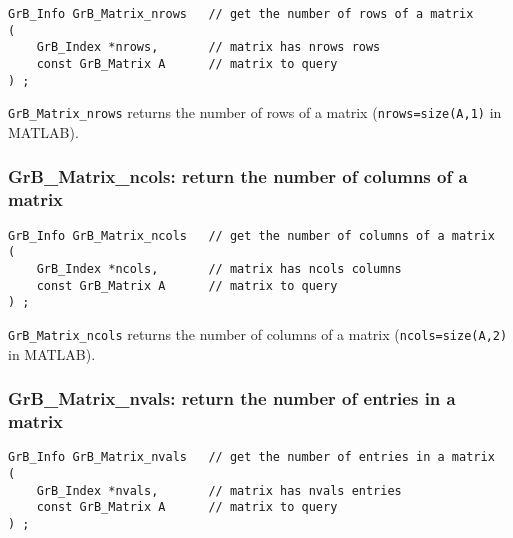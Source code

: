 \documentclass[12pt]{article}
\begin{document}
{\begin{mdframed}[userdefinedwidth=6in]
{\footnotesize
\begin{verbatim}
GrB_Info GrB_Matrix_nrows   // get the number of rows of a matrix
(
    GrB_Index *nrows,       // matrix has nrows rows
    const GrB_Matrix A      // matrix to query
) ;
\end{verbatim} } \end{mdframed}

\verb'GrB_Matrix_nrows' returns the number of rows of a matrix
(\verb'nrows=size(A,1)' in MATLAB).

\subsubsection{{\sf GrB\_Matrix\_ncols:}        return the number of columns of a matrix}
\label{matrix_ncols}

\begin{mdframed}[userdefinedwidth=6in]
{\footnotesize
\begin{verbatim}
GrB_Info GrB_Matrix_ncols   // get the number of columns of a matrix
(
    GrB_Index *ncols,       // matrix has ncols columns
    const GrB_Matrix A      // matrix to query
) ;
\end{verbatim}
} \end{mdframed}

\verb'GrB_Matrix_ncols' returns the number of columns of a matrix
(\verb'ncols=size(A,2)' in MATLAB).

\subsubsection{{\sf GrB\_Matrix\_nvals:}        return the number of entries in a matrix}
\label{matrix_nvals}

\begin{mdframed}[userdefinedwidth=6in]
{\footnotesize
\begin{verbatim}
GrB_Info GrB_Matrix_nvals   // get the number of entries in a matrix
(
    GrB_Index *nvals,       // matrix has nvals entries
    const GrB_Matrix A      // matrix to query
) ;
\end{verbatim} } \end{mdframed}

}
\end{document}
